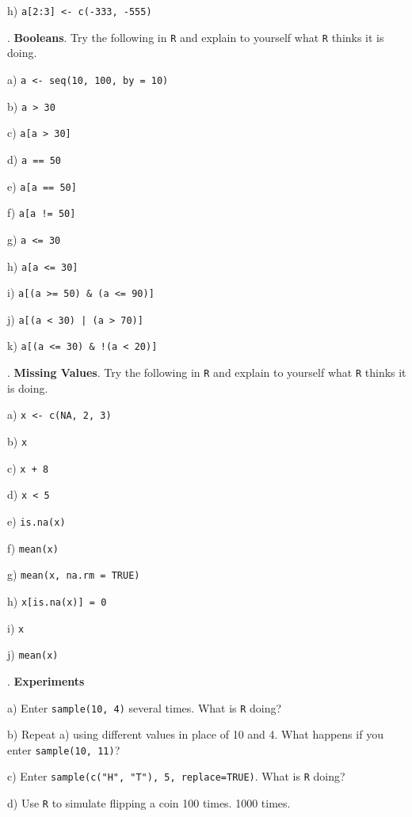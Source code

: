 \documentclass[10pt]{article}
\newcounter{EX}\setcounter{EX}{1}
\newcommand{\EXERCISE}{\arabic{EX}.\stepcounter{EX} }
\begin{document}
\SUBX h) \texttt{a[2:3] <- c(-333, -555)}
\BSK
\vfill
\eject

\EXERCISE \textbf{Booleans}.  Try the following in \texttt{R} and explain to yourself
what \texttt{R} thinks it is doing.

\SUBX a) \texttt{a <- seq(10, 100, by = 10)}
\BSK

\SUBX b) \texttt{a > 30}
\BSK

\SUBX c) \texttt{a[a > 30]}
\BSK

\SUBX d) \texttt{a == 50}
\BSK

\SUBX e) \texttt{a[a == 50]}
\BSK

\SUBX f) \texttt{a[a != 50]}
\BSK

\SUBX g) \texttt{a <= 30}
\BSK

\SUBX h) \texttt{a[a <= 30]}
\BSK

\SUBX i) \texttt{a[(a >= 50) \& (a <= 90)]}
\BSK

\SUBX j) \texttt{a[(a < 30) | (a > 70)]}
\BSK

\SUBX k) \texttt{a[(a <= 30) \& !(a < 20)]}
\BSK

\EXERCISE \textbf{Missing Values}. Try the following in \texttt{R} and explain to yourself
what \texttt{R} thinks it is doing.

\SUBX a) \texttt{x <- c(NA, 2, 3)}
\BSK

\SUBX b) \texttt{x}
\BSK

\SUBX c) \texttt{x + 8}
\BSK

\SUBX d) \texttt{x < 5}
\BSK

\SUBX e) \texttt{is.na(x)}
\BSK

\SUBX f) \texttt{mean(x)}
\BSK

\SUBX g) \texttt{mean(x, na.rm = TRUE)}
\BSK

\SUBX h) \texttt{x[is.na(x)] = 0}
\BSK

\SUBX i) \texttt{x}
\BSK

\SUBX j) \texttt{mean(x)}
\BSK
\vfill
\eject

\EXERCISE \textbf{Experiments}

\SUBX a) Enter \texttt{sample(10, 4)} several times.  
What is \texttt{R} doing?  
\BSK

\SUBX b) Repeat a) using different values in place of 10 and 4.  What happens
  if you enter \texttt{sample(10, 11)}?
\BSK

\SUBX c) Enter \texttt{sample(c("H", "T"), 5, replace=TRUE)}.
  What is \texttt{R} doing?
\BSK

\SUBX d) Use \texttt{R} to simulate flipping a coin 100 times.  1000 times. 
\bigskip
\end{document}
